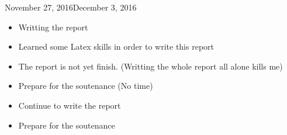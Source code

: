 \begin{fichesuivi}{November 27, 2016}{December 3, 2016}

   \begin{travaileffectue}
        \begin{itemize}
            \item Writting the report
            \item Learned some Latex skills in order to write this report
        \end{itemize}
   \end{travaileffectue}

   \begin{travailnoneffectue}
        \begin{itemize}
            \item The report is not yet finish. (Writting the whole report all alone kills me)
            \item Prepare for the soutenance (No time)
        \end{itemize}
   \end{travailnoneffectue}

 
   \begin{planification}
        \begin{itemize}
            \item Continue to write the report
            \item Prepare for the soutenance
        \end{itemize}
   \end{planification}
\end{fichesuivi}

\begin{comment}
   The summary table of work dedicated to the project is \emph{mandatory}.
If you do not use the provided weekly report sheets, you must establish the summary by yourself.
Otherwise, the simple command that follows in the source code (\verb+\printweeksummary+) does all the job of generating the table along with all the hyperlinks to the weekly reports.

\end{comment}


\printweeksummary